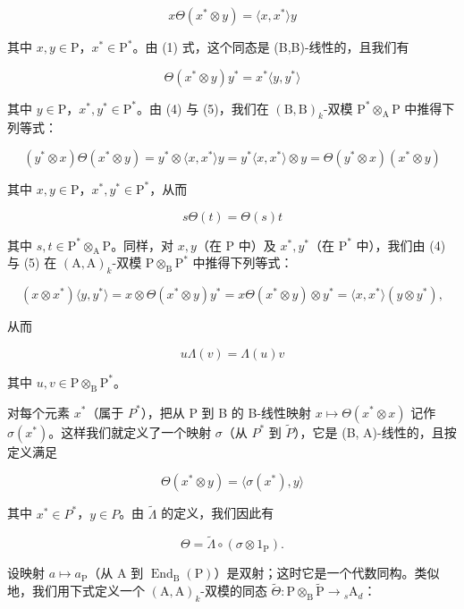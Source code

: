 \[
x \Theta (x ^ {*} \otimes y) = \langle x, x ^ {*} \rangle y\tag{4}
\]

其中 \(x, y \in \mathrm{P}\)，\(x^{*} \in \mathrm{P}^{*}\)。由 (1) 式，这个同态是 (B,B)-线性的，且我们有

\[
\Theta (x ^ {*} \otimes y) y ^ {*} = x ^ {*} \langle y, y ^ {*} \rangle\tag{5}
\]

其中 \(y \in \mathrm{P}\)，\(x^{*}, y^{*} \in \mathrm{P}^{*}\)。由 (4) 与 (5)，我们在 \((\mathrm{B}, \mathrm{B})_{k}\)-双模 \(\mathrm{P}^{*} \otimes_{\mathrm{A}} \mathrm{P}\) 中推得下列等式：

\[
(y ^ {*} \otimes x) \Theta (x ^ {*} \otimes y) = y ^ {*} \otimes \langle x, x ^ {*} \rangle y = y ^ {*} \langle x, x ^ {*} \rangle \otimes y = \Theta (y ^ {*} \otimes x) (x ^ {*} \otimes y)
\]

其中 \(x, y \in \mathrm{P}\)，\(x^{*}, y^{*} \in \mathrm{P}^{*}\)，从而

\[
s \Theta (t) = \Theta (s) t\tag{6}
\]

其中 \(s, t \in \mathrm{P}^* \otimes_{\mathrm{A}} \mathrm{P}\)。同样，对 \(x, y\)（在 \(\mathrm{P}\) 中）及 \(x^*, y^*\)（在 \(\mathrm{P}^*\) 中），我们由 (4) 与 (5) 在 \((\mathrm{A}, \mathrm{A})_k\)-双模 \(\mathrm{P} \otimes_{\mathrm{B}} \mathrm{P}^*\) 中推得下列等式：

\[
(x \otimes x ^ {*}) \langle y, y ^ {*} \rangle = x \otimes \Theta (x ^ {*} \otimes y) y ^ {*} = x \Theta (x ^ {*} \otimes y) \otimes y ^ {*} = \langle x, x ^ {*} \rangle (y \otimes y ^ {*}),
\]

从而

\[
u \Lambda (v) = \Lambda (u) v\tag{7}
\]

其中 \(u, v \in \mathrm{P} \otimes_{\mathrm{B}} \mathrm{P}^{*}\)。

对每个元素 \(x^{*}\)（属于 \(P^{*}\)），把从 P 到 B 的 B-线性映射 \(x \mapsto \Theta(x^{*} \otimes x)\) 记作 \(\sigma(x^{*})\)。这样我们就定义了一个映射 \(\sigma\)（从 \(P^{*}\) 到 \(\widetilde{P}\)），它是 (B, A)-线性的，且按定义满足

\[
\Theta (x ^ {*} \otimes y) = \langle \sigma (x ^ {*}), y \rangle\tag{8}
\]

其中 \(x^{*} \in P^{*}\)，\(y \in P\)。由 \(\widetilde{\Lambda}\) 的定义，我们因此有

\[
\Theta = \widetilde {\Lambda} \circ (\sigma \otimes 1 _ {\mathrm{P}}).\tag{9}
\]

设映射 \(a \mapsto a_{\mathrm{P}}\)（从 A 到 \(\operatorname{End}_{\mathrm{B}}(\mathrm{P})\)）是双射；这时它是一个代数同构。类似地，我们用下式定义一个 \((\mathrm{A}, \mathrm{A})_k\)-双模的同态 \(\widetilde{\Theta}: \mathrm{P} \otimes_{\mathrm{B}} \widetilde{\mathrm{P}} \to {}_s \mathrm{A}_d\)：

